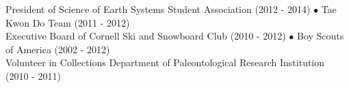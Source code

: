 

President of Science of Earth Systems Student Association (2012 - 2014) $\bullet$ Tae Kwon Do Team (2011 - 2012)\\
Executive Board of Cornell Ski and Snowboard Club (2010 - 2012) $\bullet$ Boy Scouts of America (2002 - 2012)\\
Volunteer in Collections Department of Paleontological Research Institution (2010 - 2011)
